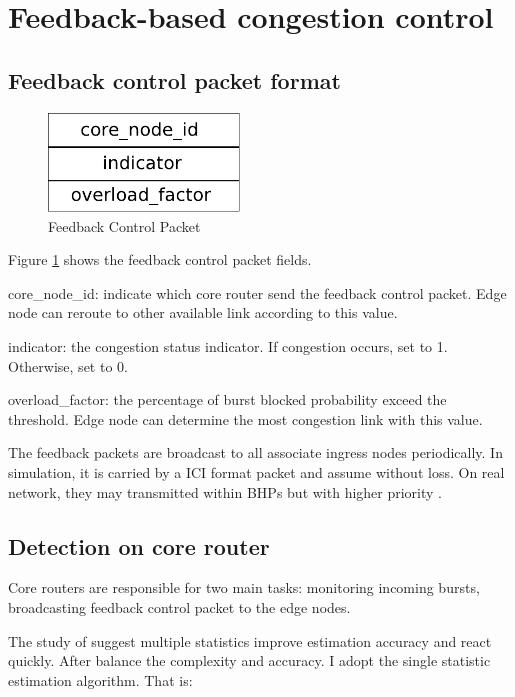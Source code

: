 \section{Feedback-based congestion control}

\subsection{Feedback control packet format}

\begin{figure}[!htb]
\centering
\includegraphics[width=2in]{fig/feedback_message}
\caption{Feedback Control Packet}
\label{fig:fcp}
\end{figure}

Figure \ref{fig:fcp} shows the feedback control packet fields.

core\_node\_id: indicate which core router send the feedback control packet.
Edge node can reroute to other available link according to this value.


indicator: the congestion status indicator. If congestion occurs, set to 1. Otherwise, set to 0.

overload\_factor: the percentage of burst blocked probability exceed the threshold. Edge node can determine the most congestion link with this value.

The feedback packets are broadcast to all associate ingress nodes periodically. In simulation, it is carried by a ICI format packet and assume without loss. On real network, they may transmitted within BHPs but with higher priority \cite{ref:real-network}. 

\subsection{Detection on core router}

Core routers are responsible for two main tasks: monitoring incoming bursts, broadcasting feedback control packet to the edge nodes.

The study of \cite{ref:long-term-detect} suggest multiple statistics improve estimation accuracy and react quickly. After balance the complexity and accuracy. I adopt the single statistic estimation algorithm. That is:

